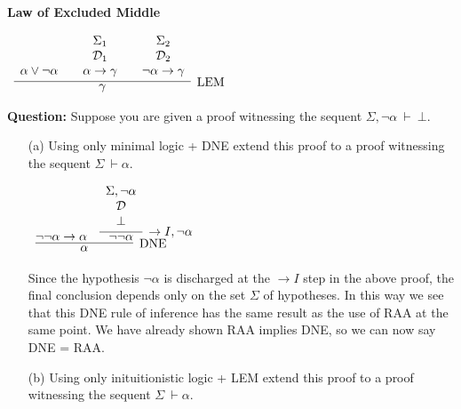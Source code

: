 \documentclass[11pt]{report}
\begin{document}
\begin{enumerate}
\begin{center}
\begin{minipage}{0.45\textwidth}
			\textbf{Law of Excluded Middle}

			$\begin{array}{ c }
			\infer[\text{LEM}]{\gamma}
			{
			\begin{array}{c} \  \\ \ \\ \alpha\lor\lnot\alpha \end{array}
			& 
			\begin{array}{c} \Sigma_{1}  \\ \mathcal{D}_{1} \\ \alpha\rightarrow\gamma \end{array}				
			& 
			\begin{array}{c} \Sigma_{2}  \\ \mathcal{D}_{2} \\ \lnot\alpha\rightarrow\gamma \end{array}				 
			}
			\end{array}$
		\end{minipage}
	\end{center}

	\textbf{Question:} Suppose you are given a proof witnessing the sequent $\Sigma, \lnot \alpha \ \vdash \ \bot$. 

	\begin{itemize}
		\item[(a)] Using only minimal logic + DNE extend this proof to a proof witnessing the sequent $ \Sigma \ \vdash \alpha$. 
		
		\begin{center}
			$\begin{array}{c}
				\infer[\DNE]{\alpha}
					{\lnot\lnot \alpha \to \alpha
					&
					\infer[\to I, \lnot \alpha]{\lnot \lnot \alpha}
						{\begin{array}{c} \Sigma, \lnot \alpha  \\ \mathcal{D} \\ \bot \end{array}}}
			\end{array}$
		\end{center}

		Since the hypothesis $\lnot \alpha$ is discharged at the $\to I$ step in the above proof, the final conclusion depends only on the set $\Sigma$ of hypotheses. In this way we see that this DNE rule of inference has the same result as the use of RAA at the same point. We have already shown RAA implies DNE, so we can now say DNE = RAA.


		\item[(b)] Using only inituitionistic logic + LEM extend this proof to a proof witnessing the sequent $ \Sigma \ \vdash \alpha$. 
		

\end{itemize}
\end{enumerate}
\end{document}

